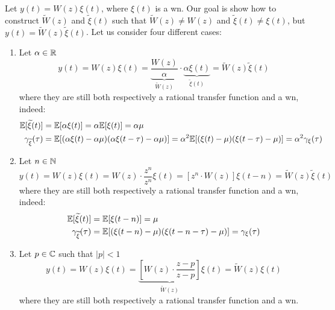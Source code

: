 Let $y(t)=W(z)\xi(t)$, where $\xi(t)$ is a \gls{wn}. Our goal is show how to construct $\tilde{W}(z)$ and $\tilde{\xi}(t)$ such that $\tilde{W}(z)\neq W(z)$ and $\tilde{\xi}(t)\neq \xi(t)$, but $y(t)=\tilde W(z)\tilde\xi(t)$. Let us consider four different cases:
\begin{enumerate}
	\item 
	Let $\alpha \in \mathbb{R}$
	\[
		y(t)=W(z) \xi(t) = \underbrace{\frac{W(z)}{\alpha}}_{\tilde{W}(z)} \cdot \underbrace{\alpha \xi(t)}_{\tilde{\xi}(t)} = \tilde{W}(z)\tilde{\xi}(t)
	\]
	where they are still both respectively a rational transfer function and a \gls{wn}, indeed:
	\begin{align*}
		\mathbb{E}[\widetilde{\xi}(t)]&=\mathbb{E}[\alpha \xi(t)]=\alpha \mathbb{E}[\xi(t)]=\alpha \mu\\
		\gamma_{\widetilde{\xi}}(\tau)&=\mathbb{E}[(\alpha\xi(t)-\alpha\mu)(\alpha \xi(t-\tau)-\alpha \mu)]=\alpha^2 \mathbb{E}[(\xi(t)-\mu)( \xi(t-\tau)- \mu)] = \alpha^2 \gamma_{\xi}(\tau)
	\end{align*}

	\item 
	Let $n \in \mathbb{N}$
	\[
		y(t)=W(z) \xi(t)=W(z) \cdot \frac{z^{n}}{z^{n}} \xi(t)=\left[z^{n} \cdot W(z)\right] \xi(t-n)=\tilde{W}(z) \tilde{\xi}(t)
	\]
	where they are still both respectively a rational transfer function and a \gls{wn}, indeed:
	\begin{align*}
		\mathbb{E}[\widetilde{\xi}(t)]&=\mathbb{E}[\xi(t-n)]=\mu \\
		\gamma_{\widetilde{\xi}}(\tau)&=\mathbb{E}[(\xi(t-n)-\mu)(\xi(t-n-\tau)-\mu)]=\gamma_{\xi}(\tau)
	\end{align*}

	\item 
	Let $p \in \mathbb{C}$ such that $|p|<1$
	\[
		y(t)=W(z) \xi(t) = \underbrace{\left[W(z) \cdot \frac{z-p}{z-p}\right]}_{\tilde{W}(z)} \xi(t)=\tilde{W}(z) \xi(t)
	\]
	where they are still both respectively a rational transfer function and a \gls{wn}.


\end{enumerate}
